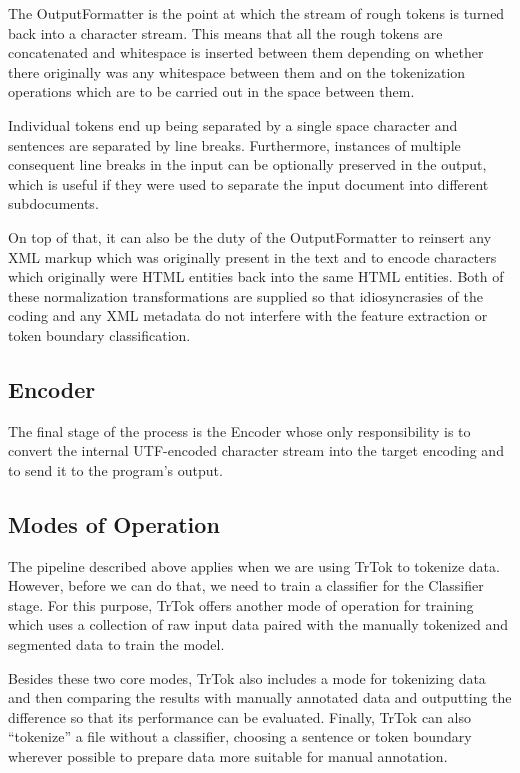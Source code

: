 The OutputFormatter is the point at which the stream of rough tokens
is turned back into a character stream. This means that all the rough
tokens are concatenated and whitespace is inserted between them
depending on whether there originally was any whitespace between them
and on the tokenization operations which are to be carried out in the
space between them.

Individual tokens end up being separated by a single space character
and sentences are separated by line breaks. Furthermore, instances of
multiple consequent line breaks in the input can be optionally
preserved in the output, which is useful if they were used to separate
the input document into different subdocuments.

On top of that, it can also be the duty of the OutputFormatter to
reinsert any XML markup which was originally present in the text and
to encode characters which originally were HTML entities back into the
same HTML entities. Both of these normalization transformations are
supplied so that idiosyncrasies of the coding and any XML metadata do
not interfere with the feature extraction or token boundary
classification.

\subsection{Encoder}

The final stage of the process is the Encoder whose only
responsibility is to convert the internal UTF-encoded character
stream into the target encoding and to send it to the program's output.

\subsection{Modes of Operation}

The pipeline described above applies when we are using TrTok to
tokenize data. However, before we can do that, we need to train a
classifier for the Classifier stage. For this purpose, TrTok offers
another mode of operation for training which uses a collection of raw
input data paired with the manually tokenized and segmented data to
train the model.

Besides these two core modes, TrTok also includes a mode for
tokenizing data and then comparing the results with manually annotated
data and outputting the difference so that its performance can be
evaluated. Finally, TrTok can also ``tokenize'' a file without a
classifier, choosing a sentence or token boundary wherever possible to
prepare data more suitable for manual annotation.

